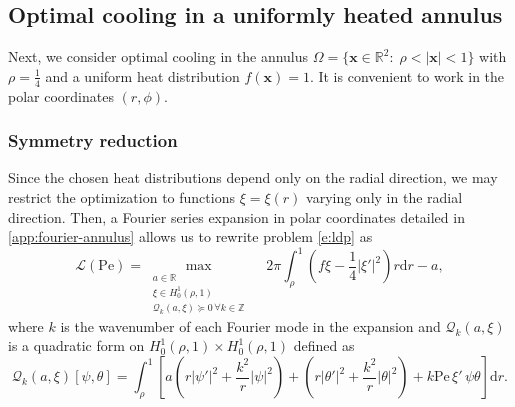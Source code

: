 \documentclass[a4paper, 10pt]{amsart}
\numberwithin{equation}{section}
\theoremstyle{plain}
\theoremstyle{definition}
\theoremstyle{remark}
\newcommand{\R}{\mathbb{R}}
\newcommand{\Z}{\mathbb{Z}}
\newcommand{\Pe}{\mathrm{Pe}}
\newcommand{\QF}{\mathcal{Q}}
\renewcommand{\vec}[1]{\mathbf{#1}}
\newcommand{\abs}[1]{\left\vert #1 \right\vert}
\newcommand{\dr}{\mathrm{d} r}
\newcommand{\lb}{\mathcal{L}}
\begin{document}
\subsection{Optimal cooling in a uniformly heated annulus}\label{ss:annulus}
Next, we consider optimal cooling in the annulus $\Omega = \{\vec{x}\in\R^2:\;\rho < \abs{\vec{x}} < 1\}$ with $\rho=\frac14$ and a uniform heat distribution $f(\vec{x})=1$. It is convenient to work in the polar coordinates $(r,\phi)$.

\subsubsection{Symmetry reduction}\label{ss:annulus-symmetrization}
Since the chosen heat distributions depend only on the radial direction, we may restrict the optimization to functions $\xi=\xi(r)$ varying only in the radial direction. Then, a Fourier series expansion in polar coordinates detailed in \cref{app:fourier-annulus} allows us to rewrite problem \cref{e:ldp} as
\begin{equation}\label{e:ldp-annulus-symm}
    \lb(\Pe) = 
    \max_{\substack{a \in \R \\ \xi \in H^1_0(\rho,1) \\ \QF_k(a,\xi)\succeq 0 \,\forall k\in\Z}}\quad
    2\pi\int_\rho^1  \left( f\xi - \frac{1}{4} \abs{\xi'}^2 \right) r\dr - a,
\end{equation}
where $k$ is the wavenumber of each Fourier mode in the expansion and $\QF_k(a,\xi)$ is a quadratic form on $H^1_0(\rho,1) \times H^1_0(\rho,1)$ defined as
\begin{equation}\label{e:qf-fourier-annulus}
    \QF_k(a,\xi)[\psi,\theta] = \int_\rho^1 
        \left[ a \left(r|\psi'|^2 + \frac{k^2}{r}|\psi|^2\right) +
         \left( r|\theta'|^2 + \frac{k^2}{r} |\theta|^2 \right)
         + k\Pe\,\xi'\,\psi \theta  \right] \dr.
\end{equation}
\end{document}

